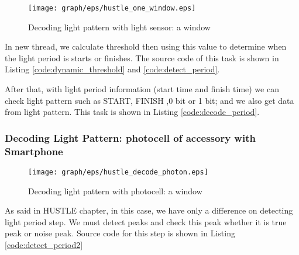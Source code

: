 \begin{figure}
\centering
\texttt{[image: graph/eps/hustle\_one\_window.eps]}
\caption{Decoding light pattern with light sensor: a window}
\label{fig:hustle_one_window}
\end{figure}



In new thread, we calculate threshold then using this value to determine when the light period is starts or finishes. The source code of this task is shown in Listing \ref{code:dynamic_threshold} and \ref{code:detect_period}.





After that, with light period information (start time and finish time) we can check light pattern such as START, FINISH ,0 bit or 1 bit; and we also get data from light pattern. This task is shown in Listing \ref{code:decode_period}.



\subsubsection{Decoding Light Pattern: photocell of accessory with Smartphone}

\begin{figure}
\centering
\texttt{[image: graph/eps/hustle\_decode\_photon.eps]}
\caption{Decoding light pattern with photocell: a window}
\label{fig:hustle_decode_photon}
\end{figure}

As said in HUSTLE chapter, in this case, we have only a difference on detecting light period step. We must detect peaks and check this peak whether it is true peak or noise peak. Source code for this step is shown in Listing \ref{code:detect_period2}



